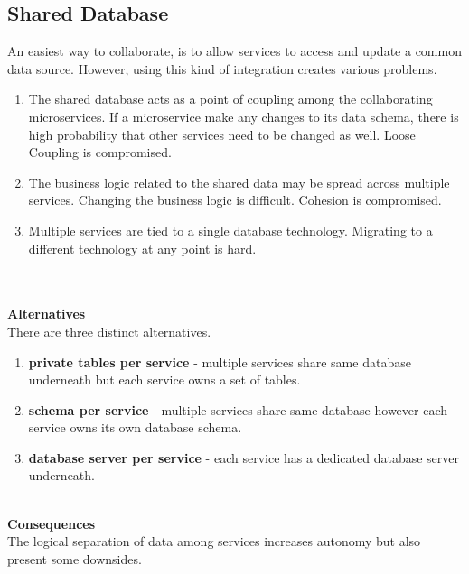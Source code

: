 \subsection{Shared Database}\label{section:challanges_of_microservices_architecture/integration/shared_database}
An easiest way to collaborate, is to allow services to access and update a common data source. However, using this kind of integration creates various problems.\cite{Newman:2015aa}
\begin{enumerate}
\item The shared database acts as a point of coupling among the collaborating microservices. If a microservice make any changes to its data schema, there is high probability that other services need to be changed as well. Loose Coupling is compromised.
\item The business logic related to the shared data may be spread across multiple services. Changing the business logic is difficult. Cohesion is compromised.
\item Multiple services are tied to a single database technology. Migrating to a different technology at any point is hard.
\end{enumerate}
\\
\\
\textbf{Alternatives}\label{section:challanges_of_microservices_architecture/integration/alternatives}
\\
There are three distinct alternatives.\cite{Richardson:2015aa}
\begin{enumerate}
\item \textbf{private tables per service} - multiple services share same database underneath but each service owns a set of tables.
\item \textbf{schema per service} - multiple services share same database however each service owns its own database schema.
\item \textbf{database server per service} - each service has a dedicated database server underneath.
\end{enumerate}
\\
\textbf{Consequences}\label{section:challanges_of_microservices_architecture/integration/consequences}
\\
The logical separation of data among services increases autonomy but also present some downsides.\cite{Richardson:2016aa} \cite{Richardson:2015aa}
